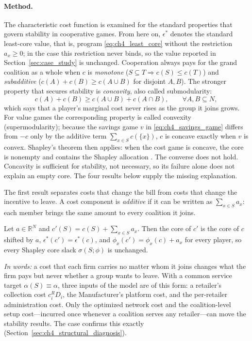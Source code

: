 \paragraph{Method.} The characteristic cost function is examined for the standard properties that govern stability in cooperative games. From here on, $\epsilon^*$ denotes the standard least-core value, that is, program \eqref{eq:ch4_least_core} without the restriction $a_x\geq0$; in the case this restriction never binds, so the value reported in Section~\ref{sec:case_study} is unchanged. Cooperation always pays for the grand coalition as a whole when $c$ is \emph{monotone} ($S\subseteq T\Rightarrow c(S)\leq c(T)$) and \emph{subadditive} ($c(A)+c(B)\geq c(A\cup B)$ for disjoint $A,B$). The stronger property that secures stability is \emph{concavity}, also called submodularity:
\begin{equation}
\label{eq:ch4_concavity}
c(A)+c(B)\geq c(A\cup B)+c(A\cap B),
\qquad \forall A,B\subseteq N,
\end{equation}
which says that a player's marginal cost never rises as the group it joins grows. For value games the corresponding property is called convexity (supermodularity); because the savings game $v$ in \eqref{eq:ch4_savings_game} differs from $-c$ only by the additive term $\sum_{x\in S}c(\{x\})$, $c$ is concave exactly when $v$ is convex. Shapley's theorem then applies: when the cost game is concave, the core is nonempty and contains the Shapley allocation \cite{Shapley1971}. The converse does not hold. Concavity is sufficient for stability, not necessary, so its failure alone does not explain an empty core. The four results below supply the missing explanation.

The first result separates costs that change the bill from costs that change the incentive to leave. A cost component is \emph{additive} if it can be written as $\sum_{x\in S}a_x$: each member brings the same amount to every coalition it joins.

\begin{proposition}
\label{prop:ch4_strategic_equivalence}
Let $a\in\mathbb{R}^{N}$ and $c'(S)=c(S)+\sum_{x\in S}a_x$. Then the core of $c'$ is the core of $c$ shifted by $a$, $\epsilon^*(c')=\epsilon^*(c)$, and $\phi_x(c')=\phi_x(c)+a_x$ for every player, so every Shapley core slack $\sigma(S;\phi)$ is unchanged.
\end{proposition}

\emph{In words:} a cost that each firm carries no matter whom it joins changes what the firm pays but never whether a group wants to leave. With a common service target $\alpha(S)\equiv\alpha$, three inputs of the model are of this form: a retailer's collection cost $c_i^R D_i$, the Manufacturer's platform cost, and the per-retailer administration cost. Only the optimized network cost and the coalition-level setup cost---incurred once whenever a coalition serves any retailer---can move the stability results. The case confirms this exactly (Section~\ref{sec:ch4_structural_diagnosis}).

